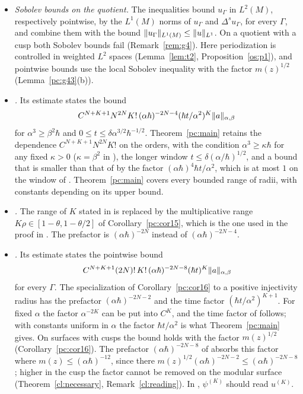 \begin{itemize}
expression \cite[(1.26)]{S} ``is of order $\hbar t$''. The corrected statement is Corollary~\ref{pc:thm13}(ii), with the same window and
generality in $\Gamma$, for every $\beta>\tfrac12$ instead of $\beta>1$, and also for the reversed-weight norm.
\item \emph{Sobolev bounds on the quotient.} The inequalities \cite[(3.3), (3.4)]{S} bound $u_\Gamma$ in $L^2(M)$, respectively pointwise, by the $L^1(M)$
norms of $u_\Gamma$ and $\Delta^su_\Gamma$, for every $\Gamma$, and \cite[Proposition~3.2 and Corollary~3.4]{S} combine them with the bound
$\lVert u_\Gamma\rVert_{L^1(M)}\le\lVert u\rVert_{L^1}$. On a quotient with a cusp both Sobolev bounds fail (Remark~\ref{rem:g4}). Here periodization is
controlled in weighted $L^2$ spaces (Lemma~\ref{lem:t2}, Proposition~\ref{os:p1}), and pointwise bounds use the local Sobolev inequality
with the factor $m(z)^{1/2}$ (Lemma~\ref{pc:g43}(b)).
\item \emph{\cite[Theorem~1.4]{S}.} Its estimate \cite[(1.30)--(1.31)]{S} states the bound
\[C^{N+K+1}N^{2N}K!\,(\alpha\hbar)^{-2N-4}(\hbar t/\alpha^2)^K\lVert a\rVert_{\alpha,\beta}\]
for $\alpha^3\ge\beta^2\hbar$ and $0\le t\le\delta\alpha^{3/2}\hbar^{-1/2}$. Theorem~\ref{pc:main} retains the dependence $C^{N+K+1}N^{2N}K!$ on the orders, with the condition
$\alpha^3\ge\kappa\hbar$ for any fixed $\kappa>0$ ($\kappa=\beta^2$ in \cite{S}), the longer window
$t\le\delta(\alpha/\hbar)^{1/2}$, and a bound that is smaller than that of \cite{S} by the factor $(\alpha\hbar)^4\hbar t/\alpha^2$,
which is at most $1$ on the window of \cite{S}.
Theorem~\ref{pc:main} covers every bounded range of radii, with constants depending on its upper bound.
\item \emph{\cite[Corollary~1.5]{S}.} The range of $K$ stated in \cite[(1.32)]{S} is replaced by the multiplicative range
$K\rho\in[1-\theta,1-\theta/2]$ of Corollary~\ref{pc:cor15}, which is the one used in the proof in \cite{S}. The prefactor is $(\alpha\hbar)^{-2N}$
instead of $(\alpha\hbar)^{-2N-4}$.
\item \emph{\cite[Corollary~1.6]{S}.} Its estimate \cite[(1.34)--(1.36)]{S} states the pointwise bound
\[C^{N+K+1}(2N)!\,K!\,(\alpha\hbar)^{-2N-8}(\hbar t)^K\lVert a\rVert_{\alpha,\beta}\]
for every $\Gamma$. The specialization of Corollary~\ref{pc:cor16} to a positive
injectivity radius has the prefactor $(\alpha\hbar)^{-2N-2}$ and the time factor $(\hbar t/\alpha^2)^{K+1}$. For fixed
$\alpha$ the factor $\alpha^{-2K}$ can be put into $C^K$, and the time factor of \cite{S} follows; with constants uniform in
$\alpha$ the factor $\hbar t/\alpha^2$ is what Theorem~\ref{pc:main} gives. On surfaces with cusps the bound holds with the factor
$m(z)^{1/2}$ (Corollary~\ref{pc:cor16}). The prefactor $(\alpha\hbar)^{-2N-8}$ of \cite{S} absorbs this factor where
$m(z)\le(\alpha\hbar)^{-12}$, since there $m(z)^{1/2}(\alpha\hbar)^{-2N-2}\le(\alpha\hbar)^{-2N-8}$; higher in the cusp the factor cannot be
removed on the modular surface (Theorem~\ref{cl:necessary}, Remark~\ref{cl:reading}). In \cite[(1.36)]{S}, $\psi^{(K)}$ should read $u^{(K)}$.
\end{itemize}
